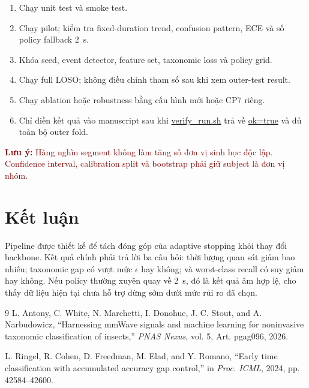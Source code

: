 \documentclass[12pt,draftclsnofoot,onecolumn]{IEEEtran}
\newcommand{\code}[1]{\url{#1}}
\newcommand{\warningtext}[1]{\textcolor{darkred}{\textbf{Lưu ý:} #1}}
\begin{document}
\begin{enumerate}[leftmargin=*]
\item Chạy unit test và smoke test.
\item Chạy pilot; kiểm tra fixed-duration trend, confusion pattern, ECE và số policy fallback 2~s.
\item Khóa seed, event detector, feature set, taxonomic loss và policy grid.
\item Chạy full LOSO; không điều chỉnh tham số sau khi xem outer-test result.
\item Chạy ablation hoặc robustness bằng cấu hình mới hoặc CP7 riêng.
\item Chỉ điền kết quả vào manuscript sau khi \code{verify_run.sh} trả về \code{ok=true} và đủ toàn bộ outer fold.
\end{enumerate}

\warningtext{Hàng nghìn segment không làm tăng số đơn vị sinh học độc lập. Confidence interval, calibration split và bootstrap phải giữ subject là đơn vị nhóm.}

\section{Kết luận}

Pipeline được thiết kế để tách đóng góp của adaptive stopping khỏi thay đổi backbone. Kết quả chính phải trả lời ba câu hỏi: thời lượng quan sát giảm bao nhiêu; taxonomic gap có vượt mức $\epsilon$ hay không; và worst-class recall có suy giảm hay không. Nếu policy thường xuyên quay về 2~s, đó là kết quả âm hợp lệ, cho thấy dữ liệu hiện tại chưa hỗ trợ dừng sớm dưới mức rủi ro đã chọn.

\begin{thebibliography}{9}
L. Antony, C. White, N. Marchetti, I. Donohue, J. C. Stout, and A. Narbudowicz, ``Harnessing mmWave signals and machine learning for noninvasive taxonomic classification of insects,'' \emph{PNAS Nexus}, vol. 5, Art. pgag096, 2026.

L. Ringel, R. Cohen, D. Freedman, M. Elad, and Y. Romano, ``Early time classification with accumulated accuracy gap control,'' in \emph{Proc. ICML}, 2024, pp. 42584--42600.
\end{thebibliography}
\end{document}
